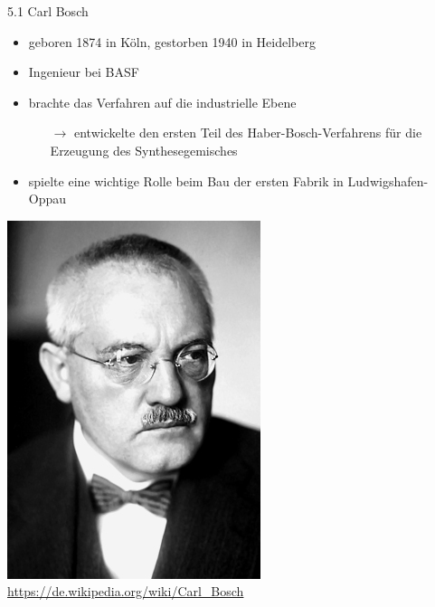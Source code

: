 \documentclass[
    aspectratio=1610
    ]{beamer}
\begin{document}
    \begin{frame}{5.1 Carl Bosch}    
        \begin{minipage}{10cm}
            \begin{itemize}
                \item geboren 1874 in Köln, gestorben 1940 in Heidelberg
                \item Ingenieur bei BASF
                \item brachte das Verfahren auf die industrielle Ebene
                \begin{itemize}
                    \item[$\rightarrow$] entwickelte den ersten Teil des Haber-Bosch-Verfahrens für die Erzeugung des Synthesegemisches                
                \end{itemize}
                \item spielte eine wichtige Rolle beim Bau der ersten Fabrik in Ludwigshafen-Oppau
            \end{itemize}    
        \end{minipage}
            \begin{minipage}{3.5cm}
                \includegraphics[scale=.42]{figures/Carl_Bosch.jpg}
                \tiny\color{gray}\url{https://de.wikipedia.org/wiki/Carl_Bosch}
            \end{minipage}
    \end{frame}
   
\end{document}
